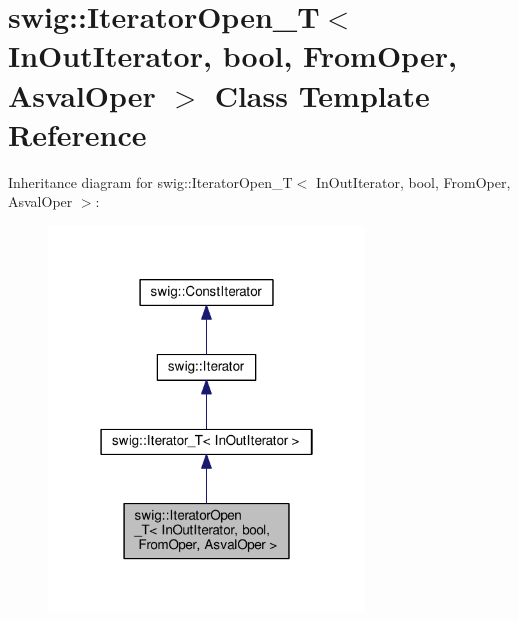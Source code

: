 \hypertarget{classswig_1_1IteratorOpen__T_3_01InOutIterator_00_01bool_00_01FromOper_00_01AsvalOper_01_4}{}\section{swig\+:\+:Iterator\+Open\+\_\+T$<$ In\+Out\+Iterator, bool, From\+Oper, Asval\+Oper $>$ Class Template Reference}
\label{classswig_1_1IteratorOpen__T_3_01InOutIterator_00_01bool_00_01FromOper_00_01AsvalOper_01_4}


Inheritance diagram for swig\+:\+:Iterator\+Open\+\_\+T$<$ In\+Out\+Iterator, bool, From\+Oper, Asval\+Oper $>$\+:
\nopagebreak
\begin{figure}[H]
\begin{center}
\leavevmode
\includegraphics[width=238pt]{classswig_1_1IteratorOpen__T_3_01InOutIterator_00_01bool_00_01FromOper_00_01AsvalOper_01_4__inherit__graph}
\end{center}
\end{figure}


